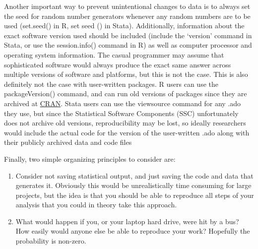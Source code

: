 \documentclass[12pt] {article}
\begin{document}
Another important way to prevent
unintentional changes to data is to always set the seed for random
number generators whenever any random numbers are to be used (set.seed()
in R, set seed () in Stata). Additionally, information about the exact
software version used should be included (include the `version' command in Stata, or use the
session.info() command in R) as well as computer processor and operating
system information. The casual programmer may assume that sophisticated
software would always produce the exact same answer across multiple
versions of software and platforms, but this is not the case. This is also definitely not the case with user-written packages. R users can use the packageVersion() command, and can run old versions of packages since they are archived at \href{http://cran.r-project.org}{CRAN}. Stata users can use the viewsource command for any .ado they use, but since the Statistical Software Components (SSC) unfortunately does not archive old versions, reproducibility may be lost, so ideally researchers would include the actual code for the version of the user-written .ado along with their publicly archived data and code files


Finally, two simple organizing principles to consider are:
\begin{enumerate}
\item 
 Consider not saving statistical output, and just saving the code and data that generates it. Obviously this would be unrealistically time consuming for large projects, but the idea is that you should be able to reproduce all steps of your analysis that you could in theory take this approach.

\item
What would happen if you, or your laptop hard drive, were hit by a bus? How easily would anyone else be able to reproduce your work? Hopefully the probability is non-zero.
\end{enumerate}
\end{document}
